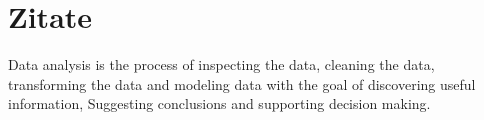 
\section{Zitate}
Data analysis is the process of inspecting the data, cleaning the data, transforming the data and modeling data with the goal of discovering useful information, Suggesting conclusions and supporting decision making. 

